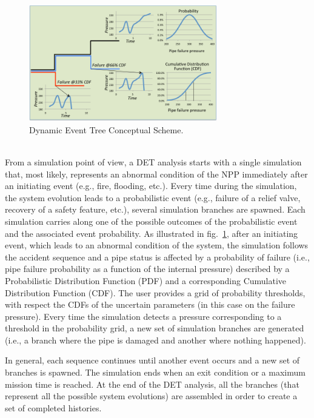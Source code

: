 \begin{figure}[h] 
  \centering
     \includegraphics[width=0.73\textwidth]{figures/DET_schemeFlow.png}
  \caption{Dynamic Event Tree Conceptual Scheme.}
   \label{fig:DET_schemeFlow}
\end{figure}
\\ From a simulation point of view, a DET analysis starts with a single simulation that, most likely, represents an abnormal condition of the NPP immediately after an initiating event (e.g., fire, flooding, etc.). Every time during the simulation, the system evolution leads to a probabilistic event (e.g., failure of a relief valve, recovery of a safety feature, etc.), several simulation branches are spawned. Each simulation carries along one of the possible outcomes of the probabilistic event and the associated event probability. As illustrated in fig.~\ref{fig:DET_schemeFlow}, after an initiating event, which leads to an abnormal condition of the system, the simulation follows the accident sequence and a pipe status is affected by a probability of failure (i.e., pipe failure probability as a function of the internal pressure) described by a Probabilistic Distribution Function (PDF) and a corresponding Cumulative Distribution Function (CDF). The user provides a grid of probability thresholds, with respect the CDFs of the uncertain parameters (in this case on the failure pressure). Every time the simulation detects a pressure corresponding to a threshold in the probability grid, a new set of simulation branches are generated (i.e., a branch where the pipe is damaged and another where nothing happened).

In general, each sequence continues until another event occurs and a new set of branches is spawned. The simulation ends when an exit condition or a maximum mission time is reached. At the end of the DET analysis, all the branches (that represent all the possible system evolutions) are assembled in order to create a set of completed histories.   
